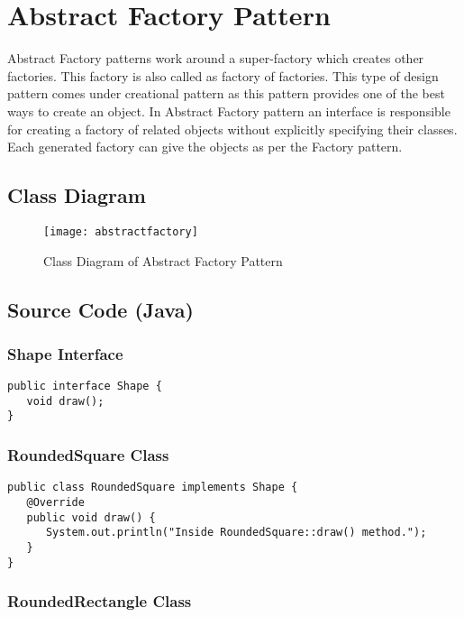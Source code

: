 \newpage
\section{Abstract Factory Pattern}

Abstract Factory patterns work around a super-factory which creates other factories. This factory is also called as factory of factories. This type of design pattern comes under creational pattern as this pattern provides one of the best ways to create an object.
In Abstract Factory pattern an interface is responsible for creating a factory of related objects without explicitly specifying their classes. Each generated factory can give the objects as per the Factory pattern.

\subsection{Class Diagram}

\begin{figure}[h]
\centering
\texttt{[image: abstractfactory]}
\caption{Class Diagram of Abstract Factory Pattern}
\end{figure}

\newpage
\subsection{Source Code (Java)}
\subsubsection{Shape Interface}

\begin{verbatim}
public interface Shape {
   void draw();
}
\end{verbatim}


\subsubsection{RoundedSquare Class}

\begin{verbatim}
public class RoundedSquare implements Shape {
   @Override
   public void draw() {
      System.out.println("Inside RoundedSquare::draw() method.");
   }
}
\end{verbatim}

\subsubsection{RoundedRectangle Class}

